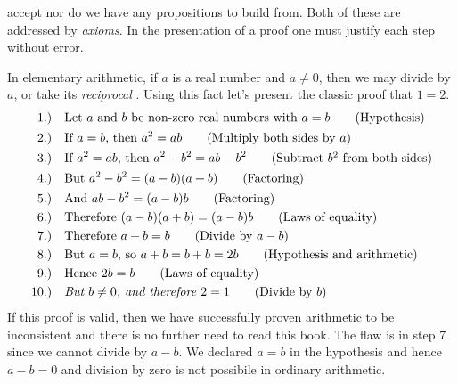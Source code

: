         accept nor do we have any propositions to build from. Both of these are
        addressed by \textit{axioms}. In the presentation of a proof one must
        justify each step without error.
        \begin{example}
            In elementary arithmetic, if $a$ is a real number and $a\ne{0}$,
            then we may divide by $a$, or take its \textit{reciprocal}%
            . Using this fact let's present the classic proof
            that $1=2$.
            \begin{align}
                1.)\quad&
                \text{Let $a$ and $b$ be non-zero real numbers with $a=b$}
                \tag{Hypothesis}\\
                2.)\quad
                &\text{If $a=b$, then $a^{2}=ab$}
                \tag{Multiply both sides by $a$}\\
                3.)\quad
                &\text{If $a^{2}=ab$, then $a^{2}-b^{2}=ab-b^{2}$}
                \tag{Subtract $b^{2}$ from both sides}\\
                4.)\quad
                &\text{But $a^{2}-b^{2}=(a-b)(a+b)$}
                \tag{Factoring}\\
                5.)\quad
                &\text{And $ab-b^{2}=(a-b)b$}
                \tag{Factoring}\\
                6.)\quad
                &\text{Therefore $(a-b)(a+b)=(a-b)b$}
                \tag{Laws of equality}\\
                7.)\quad
                &\text{Therefore $a+b=b$}
                \tag{Divide by $a-b$}\\
                8.)\quad
                &\text{But $a=b$, so $a+b=b+b=2b$}
                \tag{Hypothesis and arithmetic}\\
                9.)\quad
                &\text{Hence $2b=b$}
                \tag{Laws of equality}\\
                10.)\quad
                &\textit{But $b\ne{0}$, and therefore $2=1$}
                \tag{Divide by $b$}
            \end{align}
            If this proof is valid, then we have successfully proven arithmetic
            to be inconsistent and there is no further need to read this book.
            The flaw is in step 7 since we cannot divide by $a-b$. We declared
            $a=b$ in the hypothesis and hence $a-b=0$ and division by zero is
            not possibile in ordinary arithmetic.
        \end{example}
